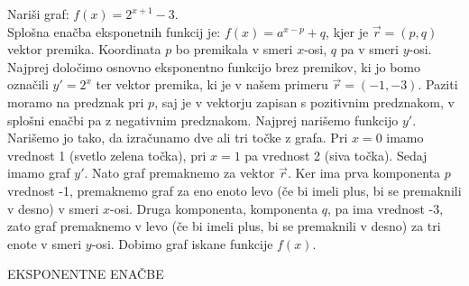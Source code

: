 \begin{zgled}
Nariši graf: $f(x) = 2^{x+1} - 3$. \\
Splošna enačba eksponetnih funkcij je: $f(x) = a^{x-p} + q$, kjer je $\vec{r}=(p, q)$ vektor premika. Koordinata $p$ bo premikala v smeri $x$-osi, $q$ pa v smeri $y$-osi. Najprej določimo osnovno eksponentno funkcijo brez premikov, ki jo bomo označili $y'=2^x$ ter vektor premika, ki je v našem primeru $\vec{r}=(-1, -3)$. Paziti moramo na predznak pri $p$, saj je v vektorju zapisan s pozitivnim predznakom, v splošni enačbi pa z negativnim predznakom. Najprej narišemo funkcijo $y'$. Narišemo jo tako, da izračunamo dve ali tri točke z grafa. Pri $x=0$ imamo vrednost 1 (svetlo zelena točka), pri $x=1$ pa vrednost 2 (siva točka). Sedaj imamo graf $y'$. Nato graf premaknemo za vektor $\vec{r}$. Ker ima prva komponenta $p$ vrednost -1, premaknemo graf za eno enoto levo (če bi imeli plus, bi se premaknili v desno) v smeri $x$-osi. Druga komponenta, komponenta $q$, pa ima vrednost -3, zato graf premaknemo v levo (če bi imeli plus, bi se premaknili v desno) za tri enote v smeri $y$-osi. Dobimo graf iskane funkcije $f(x)$.
%
\begin{figure}[h!]
\centering
{}
\end{figure}
%
\end{zgled}

\newpage
\begin{center}
EKSPONENTNE ENAČBE
\end{center}

